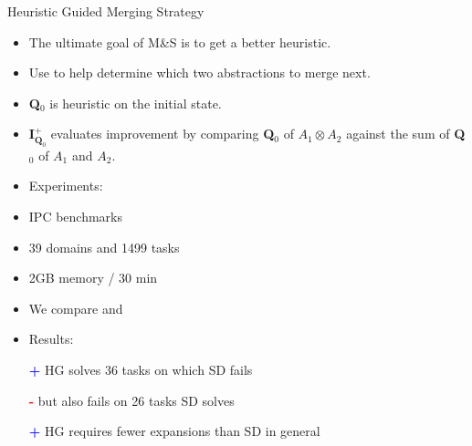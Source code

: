 \begin{myblock}{Heuristic Guided Merging Strategy}
\Large
\begin{itemize}
\item The ultimate goal of M\&S is to get a better heuristic.
\item Use  to help determine which two abstractions to merge next.
\end{itemize}
\hspace*{1in}
\begin{minipage}{0.8\textwidth}
\begin{itemize}
\item \textbf{Q}$_0$ is heuristic on the initial state.
\item \textbf{I}$^+_{\textbf{Q}_0}$ evaluates improvement by comparing \textbf{Q}$_0$ of $A_1 \otimes A_2$ against the sum of \textbf{Q}$_0$ of $A_1$ and $A_2$.
\end{itemize}
\end{minipage}
\vspace*{0.3in}
\begin{itemize}
\item Experiments:
\end{itemize}
\hspace*{0.5in}
\begin{minipage}{0.37\textwidth}
\normalsize
\vspace*{0.3in}
\begin{itemize}
\item IPC benchmarks
\item 39 domains and 1499 tasks
\item 2GB memory / 30 min
\item We compare  and 
\item Results:
\item[\textcolor{blue}{\textbf{+}}] HG solves 36 tasks on which SD fails
\item[\textcolor{red}{\textbf{-}}] but also fails on 26 tasks SD solves
\item[\textcolor{blue}{\textbf{+}}] HG requires fewer expansions than SD in general
\end{itemize}
\end{minipage}
\begin{minipage}{0.57\textwidth}
  \centering

\end{minipage}
\end{myblock}
